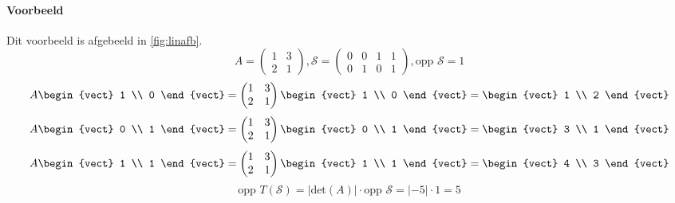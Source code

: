 \paragraph{Voorbeeld} Dit voorbeeld is afgebeeld in \autoref{fig:linafb}.
\[ A = \begin{pmatrix} 1 & 3 \\ 2 & 1 \end{pmatrix}, \mathcal{S} = \begin{pmatrix} 0 & 0 & 1 & 1 \\ 0 & 1 & 0 & 1 \end{pmatrix}, \mbox{opp }\mathcal{S} = 1 \]
\[ A \begin{vect} 1 \\ 0 \end{vect} = \begin{pmatrix} 1 & 3 \\ 2 & 1 \end{pmatrix} \begin{vect} 1 \\ 0 \end{vect} = \begin{vect} 1 \\ 2 \end{vect} \]
\[ A \begin{vect} 0 \\ 1 \end{vect} = \begin{pmatrix} 1 & 3 \\ 2 & 1 \end{pmatrix} \begin{vect} 0 \\ 1 \end{vect} = \begin{vect} 3 \\ 1 \end{vect} \]
\[ A \begin{vect} 1 \\ 1 \end{vect} = \begin{pmatrix} 1 & 3 \\ 2 & 1 \end{pmatrix} \begin{vect} 1 \\ 1 \end{vect} = \begin{vect} 4 \\ 3 \end{vect} \]
\[ \mbox{opp } T(\mathcal{S}) = |\mbox{det}(A)| \cdot \mbox{opp } \mathcal{S} = |-5| \cdot 1 = 5 \]

